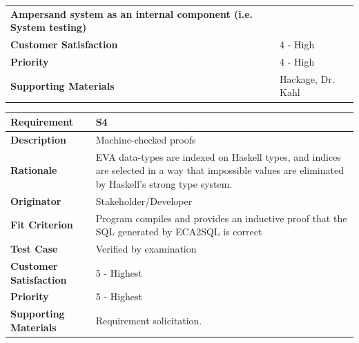 \documentclass[12pt]{report}
\begin{document}
{{\begin{tabularx}{\textwidth}{>{\bfseries}m{3cm}X}
        Ampersand system as an internal component (i.e. System testing)
        \\	Customer Satisfaction & 4 - High 
        \\	Priority & 4 - High
        \\	Supporting Materials & Hackage, Dr. Kahl
        \vspace{12pt}
    \end{tabularx}
}
{\setlength{\tabcolsep}{6pt} %
    \begin{tabularx}{\textwidth}{>{\bfseries}m{3cm}X}
        Requirement & S4 \\ 
        \midrule
        \endhead
        Description  & Machine-checked proofs
        \\	Rationale & EVA data-types are indexed on Haskell types, and 
        indices are selected in a way that impossible values are eliminated by 
        Haskell's strong type system.
        \\	Originator & Stakeholder/Developer
        
        \\	Fit Criterion & Program compiles and provides an inductive proof 
        that the SQL generated by ECA2SQL is correct
        \\ Test Case & Verified by examination
        \\	Customer Satisfaction & 5 - Highest 
        \\	Priority & 5 - Highest 
        \\	Supporting Materials & Requirement solicitation.
        \vspace{12pt}
    \end{tabularx}
}
}
\end{document}
